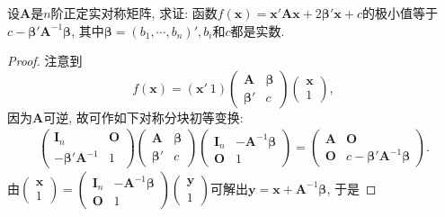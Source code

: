 \documentclass[../../main.tex]{subfiles}%
\begin{document}
\begin{example}
设$\boldsymbol{A}$是$n$阶正定实对称矩阵, 求证: 函数$f(\boldsymbol{x})=\boldsymbol{x}'\boldsymbol{A}\boldsymbol{x}+2\boldsymbol{\beta}'\boldsymbol{x}+c$的极小值等于$c - \boldsymbol{\beta}'\boldsymbol{A}^{-1}\boldsymbol{\beta}$, 其中$\boldsymbol{\beta}=(b_1, \cdots, b_n)', b_i$和$c$都是实数.
\end{example}
\begin{proof}
注意到
\[
f(\boldsymbol{x})=(\boldsymbol{x}'\ 1)\begin{pmatrix}
\boldsymbol{A} & \boldsymbol{\beta} \\
\boldsymbol{\beta}' & c
\end{pmatrix}\begin{pmatrix}
\boldsymbol{x} \\
1
\end{pmatrix},
\]
因为$\boldsymbol{A}$可逆, 故可作如下对称分块初等变换:
\begin{align*}
\begin{pmatrix}
\boldsymbol{I}_n & \boldsymbol{O} \\
-\boldsymbol{\beta}'\boldsymbol{A}^{-1} & 1
\end{pmatrix}
\begin{pmatrix}
\boldsymbol{A} & \boldsymbol{\beta} \\
\boldsymbol{\beta}' & c
\end{pmatrix}
\begin{pmatrix}
\boldsymbol{I}_n & -\boldsymbol{A}^{-1}\boldsymbol{\beta} \\
\boldsymbol{O} & 1
\end{pmatrix}
=
\begin{pmatrix}
\boldsymbol{A} & \boldsymbol{O} \\
\boldsymbol{O} & c - \boldsymbol{\beta}'\boldsymbol{A}^{-1}\boldsymbol{\beta}
\end{pmatrix}.
\end{align*}
由$\begin{pmatrix}
\boldsymbol{x} \\
1
\end{pmatrix}=\begin{pmatrix}
\boldsymbol{I}_n & -\boldsymbol{A}^{-1}\boldsymbol{\beta} \\
\boldsymbol{O} & 1
\end{pmatrix}\begin{pmatrix}
\boldsymbol{y} \\
1
\end{pmatrix}$可解出$\boldsymbol{y}=\boldsymbol{x}+\boldsymbol{A}^{-1}\boldsymbol{\beta}$, 于是

\end{proof}
\end{document}
